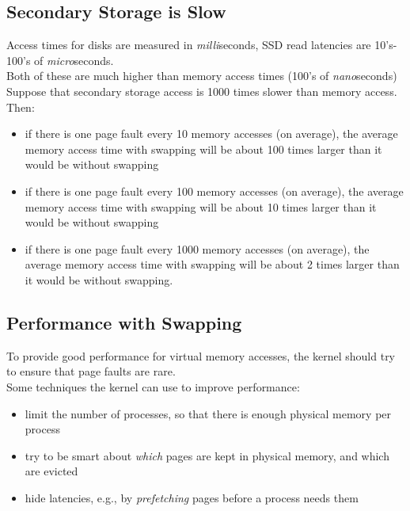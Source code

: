 \documentclass[12pt]{article}
\theoremstyle{plain}
\theoremstyle{definition}
\begin{document}
\subsection{Secondary Storage is Slow}
Access times for disks are measured in \emph{milli}seconds, SSD read latencies are 10's-100's of \emph{micro}seconds. \\

Both of these are much higher than memory access times (100's of \emph{nano}seconds) \\

Suppose that secondary storage access is 1000 times slower than memory access.
Then:
\begin{itemize}
  \item if there is one page fault every 10 memory accesses (on average), the average memory access time with swapping will be about 100 times larger than it would be without swapping
  \item if there is one page fault every 100 memory accesses (on average), the average memory access time with swapping will be about 10 times larger than it would be without swapping
  \item if there is one page fault every 1000 memory accesses (on average), the average memory access time with swapping will be about 2 times larger than it would be without swapping.
\end{itemize}

\subsection{Performance with Swapping}
To provide good performance for virtual memory accesses, the kernel should try to ensure that page faults are rare. \\

Some techniques the kernel can use to improve performance:
\begin{itemize}
  \item limit the number of processes, so that there is enough physical memory per process
  \item try to be smart about \emph{which} pages are kept in physical memory, and which are evicted
  \item hide latencies, e.g., by \emph{prefetching} pages before a process needs them
\end{itemize}
\end{document}
